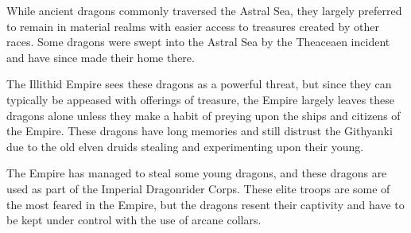 While ancient dragons commonly traversed the Astral Sea, they largely preferred to remain in material realms with easier access to treasures created by other races.
Some dragons were swept into the Astral Sea by the Theaceaen incident and have since made their home there.

The Illithid Empire sees these dragons as a powerful threat, but since they can typically be appeased with offerings of treasure, the Empire largely leaves these dragons alone unless they make a habit of preying upon the ships and citizens of the Empire.
These dragons have long memories and still distrust the Githyanki due to the old elven druids stealing and experimenting upon their young.

The Empire has managed to steal some young dragons, and these dragons are used as part of the Imperial Dragonrider Corps.
These elite troops are some of the most feared in the Empire, but the dragons resent their captivity and have to be kept under control with the use of arcane collars.
